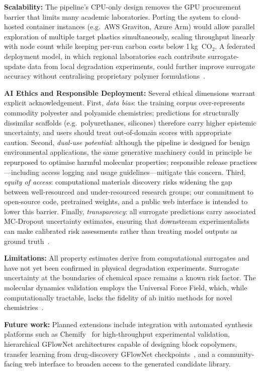 \documentclass[twocolumn,10pt]{article}
\begin{document}
\noindent\textbf{Scalability:} The pipeline's CPU-only design removes the GPU procurement barrier
that limits many academic laboratories. Porting the system to cloud-hosted container
instances (e.g.\ AWS Graviton, Azure Arm) would allow parallel exploration of multiple
target plastics simultaneously, scaling throughput linearly with node count while keeping
per-run carbon costs below 1\,kg~CO$_2$. A federated deployment model, in which regional
laboratories each contribute surrogate-update data from local degradation experiments,
could further improve surrogate accuracy without centralising proprietary polymer
formulations~\cite{mcmahan2017communication}.
\vfill
\newpage

\noindent\textbf{AI Ethics and Responsible Deployment:} Several ethical dimensions warrant explicit
acknowledgement. First, \textit{data bias}: the training corpus over-represents commodity
polyester and polyamide chemistries; predictions for structurally dissimilar scaffolds
(e.g.\ polyurethanes, silicones) therefore carry higher epistemic uncertainty, and users
should treat out-of-domain scores with appropriate caution. Second,
\textit{dual-use potential}: although the pipeline is designed for benign environmental
applications, the same generative machinery could in principle be repurposed to optimise
harmful molecular properties; responsible release practices---including access logging
and usage guidelines---mitigate this concern. Third, \textit{equity of access}:
computational materials discovery risks widening the gap between well-resourced and
under-resourced research groups; our commitment to open-source code, pretrained weights,
and a public web interface is intended to lower this barrier. Finally,
\textit{transparency}: all surrogate predictions carry associated MC-Dropout uncertainty
estimates, ensuring that downstream experimentalists can make calibrated risk assessments
rather than treating model outputs as ground truth~\cite{henderson2020towards}.

\noindent\textbf{Limitations:} All property estimates derive from computational surrogates and have
not yet been confirmed in physical degradation experiments. Surrogate uncertainty at the
boundaries of chemical space remains a known risk factor. The molecular dynamics
validation employs the Universal Force Field, which, while computationally tractable,
lacks the fidelity of ab initio methods for novel
chemistries~\cite{rappe1992uff}.

\noindent\textbf{Future work:} Planned extensions include integration with automated synthesis
platforms such as Chemify~\cite{mehr2020chemify} for high-throughput experimental
validation, hierarchical GFlowNet architectures capable of designing block copolymers,
transfer learning from drug-discovery GFlowNet
checkpoints~\cite{jain2023mogfn}, and a community-facing web interface to broaden
access to the generated candidate library.
\end{document}
